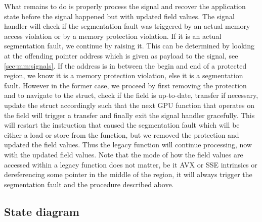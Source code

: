 What remains to do is properly process the signal and recover the application state before the signal happened but with updated field values.
The signal handler will check if the segmentation fault was triggered by an actual memory access violation or by a memory protection violation.
If it is an actual segmentation fault, we continue by raising it.
This can be determined by looking at the offending pointer address which is given as payload to the signal, see \cref{sec:mm:signals}.
If the address is in between the begin and end of a protected region, we know it is a memory protection violation, else it is a segmentation fault.
However in the former case, we proceed by first removing the protection and to navigate to the  struct, check if the field is up-to-date, transfer if necessary, update the  struct accordingly such that the next GPU function that operates on the field will trigger a transfer and finally exit the signal handler gracefully.
This will restart the instruction that caused the segmentation fault which will be either a load or store from the \openqxd function, but we removed the protection and updated the field values.
Thus the legacy function will continue processing, now with the updated field values.
Note that the mode of how the field values are accessed within a legacy function does not matter, be it AVX or SSE intrinsics or dereferencing some pointer in the middle of the region, it will always trigger the segmentation fault and the procedure described above.

\subsection{State diagram}

